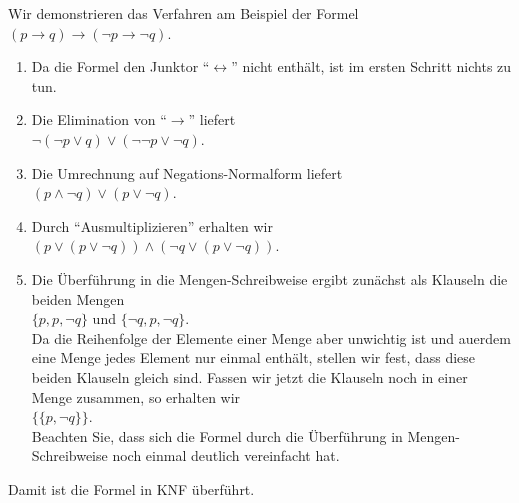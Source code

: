 Wir demonstrieren das Verfahren am Beispiel der Formel\\[0.2cm]
\hspace*{1.3cm} $(p \rightarrow q) \rightarrow (\neg p \rightarrow \neg q)$.
\begin{enumerate}
\item Da die Formel den Junktor ``$\leftrightarrow$'' nicht enth\"{a}lt,
      ist im ersten Schritt nichts zu tun.
\item Die Elimination von ``$\rightarrow$'' liefert \\[0.2cm]
      \hspace*{1.3cm} $\neg (\neg p \vee q) \vee (\neg \neg p \vee \neg q)$.
\item Die Umrechnung auf Negations-Normalform liefert \\[0.2cm]
      \hspace*{1.3cm} $(p \wedge \neg q) \vee (p \vee \neg q)$.
\item Durch ``Ausmultiplizieren'' erhalten wir \\[0.2cm]
      \hspace*{1.3cm} $(p \vee (p \vee \neg q)) \wedge (\neg q \vee (p \vee \neg q))$.
\item Die \"{U}berf\"{u}hrung in die Mengen-Schreibweise ergibt zun\"{a}chst als Klauseln die beiden Mengen \\[0.2cm]
      \hspace*{1.3cm} $\{p, p, \neg q\}$ \quad und \quad $\{\neg q,  p,  \neg q\}$. \\[0.2cm]
      Da die Reihenfolge der Elemente einer Menge aber unwichtig ist und au\3erdem eine Menge
      jedes Element nur einmal enth\"{a}lt, stellen wir fest, dass diese beiden Klauseln gleich sind.
      Fassen wir jetzt die Klauseln noch in einer Menge zusammen, so erhalten wir \\[0.2cm]
      \hspace*{1.3cm} $\bigl\{ \{p, \neg q\} \bigr\}$. \\[0.2cm]
      Beachten Sie, dass sich die Formel durch die \"{U}berf\"{u}hrung in 
      Mengen-Schreibweise noch einmal deutlich vereinfacht hat.
\end{enumerate}
Damit ist die Formel in KNF \"{u}berf\"{u}hrt.

